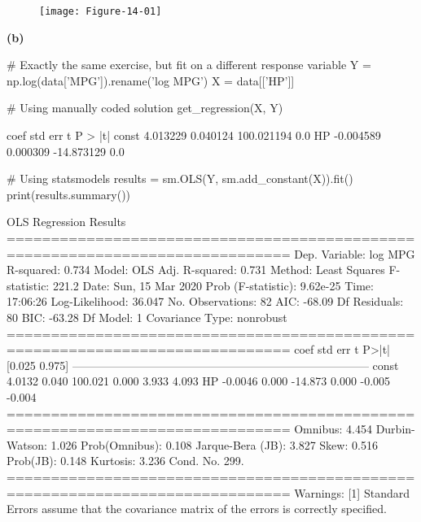 \begin{figure}[H]
\centering
\texttt{[image: Figure-14-01]}
\end{figure}

\textbf{(b)}

\begin{python}
# Exactly the same exercise, but fit on a different response variable
Y = np.log(data['MPG']).rename('log MPG')
X = data[['HP']]
\end{python}

\begin{python}
# Using manually coded solution
get_regression(X, Y)
\end{python}
\begin{console}
	coef	std err	t	P > |t|
const	4.013229	0.040124	100.021194	0.0
HP	-0.004589	0.000309	-14.873129	0.0
\end{console}

\begin{python}
# Using statsmodels
results = sm.OLS(Y, sm.add_constant(X)).fit()
print(results.summary())
\end{python}
\begin{console}
                            OLS Regression Results
==============================================================================
Dep. Variable:                log MPG   R-squared:                       0.734
Model:                            OLS   Adj. R-squared:                  0.731
Method:                 Least Squares   F-statistic:                     221.2
Date:                Sun, 15 Mar 2020   Prob (F-statistic):           9.62e-25
Time:                        17:06:26   Log-Likelihood:                 36.047
No. Observations:                  82   AIC:                            -68.09
Df Residuals:                      80   BIC:                            -63.28
Df Model:                           1
Covariance Type:            nonrobust
==============================================================================
                 coef    std err          t      P>|t|      [0.025      0.975]
------------------------------------------------------------------------------
const          4.0132      0.040    100.021      0.000       3.933       4.093
HP            -0.0046      0.000    -14.873      0.000      -0.005      -0.004
==============================================================================
Omnibus:                        4.454   Durbin-Watson:                   1.026
Prob(Omnibus):                  0.108   Jarque-Bera (JB):                3.827
Skew:                           0.516   Prob(JB):                        0.148
Kurtosis:                       3.236   Cond. No.                         299.
==============================================================================
Warnings:
[1] Standard Errors assume that the covariance matrix of the errors is correctly
specified.
\end{console}

